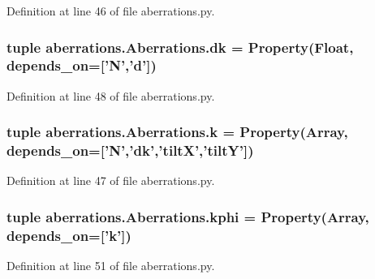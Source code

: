 Definition at line 46 of file aberrations.\-py.

\hypertarget{classaberrations_1_1_aberrations_a2ca713e45b3e4a8eb7c8404922ca6d7b}{
\subsubsection[{dk}]{\setlength{\rightskip}{0pt plus 5cm}tuple aberrations.\-Aberrations.\-dk = Property(Float, depends\-\_\-on=\mbox{[}'{\bf N}','{\bf d}'\mbox{]})\hspace{0.3cm}{\ttfamily [static]}}}\label{classaberrations_1_1_aberrations_a2ca713e45b3e4a8eb7c8404922ca6d7b}


Definition at line 48 of file aberrations.\-py.

\hypertarget{classaberrations_1_1_aberrations_a5f63dc7f3be647efe0273e85365be295}{
\subsubsection[{k}]{\setlength{\rightskip}{0pt plus 5cm}tuple aberrations.\-Aberrations.\-k = Property(Array, depends\-\_\-on=\mbox{[}'{\bf N}','{\bf dk}','{\bf tilt\-X}','{\bf tilt\-Y}'\mbox{]})\hspace{0.3cm}{\ttfamily [static]}}}\label{classaberrations_1_1_aberrations_a5f63dc7f3be647efe0273e85365be295}


Definition at line 47 of file aberrations.\-py.

\hypertarget{classaberrations_1_1_aberrations_a925844b4d0d329bb014f28b66ab53d44}{
\subsubsection[{kphi}]{\setlength{\rightskip}{0pt plus 5cm}tuple aberrations.\-Aberrations.\-kphi = Property(Array, depends\-\_\-on=\mbox{[}'{\bf k}'\mbox{]})\hspace{0.3cm}{\ttfamily [static]}}}\label{classaberrations_1_1_aberrations_a925844b4d0d329bb014f28b66ab53d44}


Definition at line 51 of file aberrations.\-py.

